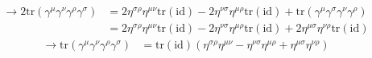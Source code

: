 \documentclass[../main.tex]{subfiles}
\begin{document}
\begin{enumerate}[a)]
\begin{itemize}
\begin{align}
\rightarrow
2\text{tr}(\gamma^\mu\gamma^\nu\gamma^\rho\gamma^\sigma)
&=2\eta^{\sigma\rho}\eta^{\mu\nu}\text{tr}(\text{id})-2\eta^{\nu\sigma}\eta^{\mu\rho}\text{tr}(\text{id})+\text{tr}(\gamma^\mu\gamma^\sigma\gamma^\nu\gamma^\rho)\\
&=2\eta^{\sigma\rho}\eta^{\mu\nu}\text{tr}(\text{id})-2\eta^{\nu\sigma}\eta^{\mu\rho}\text{tr}(\text{id})+2\eta^{\mu\sigma}\eta^{\nu\rho}\text{tr}(\text{id})
\end{align}
\begin{align}
\rightarrow
\text{tr}(\gamma^\mu\gamma^\nu\gamma^\rho\gamma^\sigma)
&=\text{tr}(\text{id})\left(\eta^{\sigma\rho}\eta^{\mu\nu}-\eta^{\nu\sigma}\eta^{\mu\rho}+\eta^{\mu\sigma}\eta^{\nu\rho}\right)
\end{align}


\end{itemize}

\end{enumerate}
\end{document}
